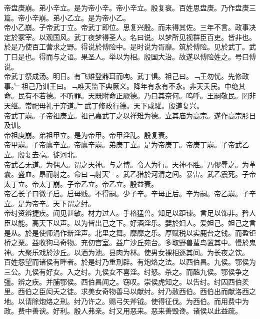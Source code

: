 \documentclass{zhvt-classic}
\begin{document}
\hspace*{2em}帝盘庚崩。弟小辛立。是为帝小辛。帝小辛立。殷复衰。百姓思盘庚。乃作盘庚三篇。帝小辛崩。弟小乙立。是为帝小乙。\\
\hspace*{2em}帝小乙崩。子帝武丁立。帝武丁即位。思复兴殷。而未得其佐。三年不言。政事决定於冢宰。以观国风。武丁夜梦得圣人。名曰说。以梦所见视群臣百吏。皆非也。於是乃使百工营求之野。得说於傅险中。是时说为胥靡。筑於傅险。见於武丁。武丁曰是也。得而与之语。果圣人。举以为相。殷国大治。故遂以傅险姓之。号曰傅说。\\
\hspace*{2em}帝武丁祭成汤。明日。有飞雉登鼎耳而呴。武丁惧。祖己曰。﹁王勿忧。先修政事。﹂祖己乃训王曰。﹁唯天监下典厥义。降年有永有不永。非天夭民。中绝其命。民有不若德。不听罪。天既附命正厥德。乃曰其奈何。呜呼。王嗣敬民。罔非天继。常祀毋礼于弃道。﹂武丁修政行德。天下咸驩。殷道复兴。\\
\hspace*{2em}帝武丁崩。子帝祖庚立。祖己嘉武丁之以祥雉为德。立其庙为高宗。遂作高宗肜日及训。\\
\hspace*{2em}帝祖庚崩。弟祖甲立。是为帝甲。帝甲淫乱。殷复衰。\\
\hspace*{2em}帝甲崩。子帝廪辛立。帝廪辛崩。弟庚丁立。是为帝庚丁。帝庚丁崩。子帝武乙立。殷复去亳。徙河北。\\
\hspace*{2em}帝武乙无道。为偶人。谓之天神。与之博。令人为行。天神不胜。乃僇辱之。为革囊。盛血。昂而射之。命曰﹁射天﹂。武乙猎於河渭之间。暴雷。武乙震死。子帝太丁立。帝太丁崩。子帝乙立。帝乙立。殷益衰。\\
\hspace*{2em}帝乙长子曰微子启。启母贱。不得嗣。少子辛。辛母正后。辛为嗣。帝乙崩。子辛立。是为帝辛。天下谓之纣。\\
\hspace*{2em}帝纣资辨捷疾。闻见甚敏。材力过人。手格猛兽。知足以距谏。言足以饰非。矜人臣以能。高天下以声。以为皆出己之下。好酒淫乐。嬖於妇人。爱妲己。妲己之言是从。於是使师涓作新淫声。北里之舞。靡靡之乐。厚赋税以实鹿台之钱。而盈钜桥之粟。益收狗马奇物。充仞宫室。益广沙丘苑台。多取野兽蜚鸟置其中。慢於鬼神。大聚乐戏於沙丘。以酒为池。县肉为林。使男女裸相逐其间。为长夜之饮。\\
\hspace*{2em}百姓怨望而诸侯有畔者。於是纣乃重刑辟。有炮烙之法。以西伯昌。九侯。鄂侯为三公。九侯有好女。入之纣。九侯女不喜淫。纣怒。杀之。而醢九侯。鄂侯争之彊。辨之疾。并脯鄂侯。西伯昌闻之。窃叹。崇侯虎知之。以告纣。纣囚西伯羑里。西伯之臣闳夭之徒。求美女奇物善马以献纣。纣乃赦西伯。西伯出而献洛西之地。以请除炮烙之刑。纣乃许之。赐弓矢斧钺。使得征伐。为西伯。而用费中为政。费中善谀。好利。殷人弗亲。纣又用恶来。恶来善毁谗。诸侯以此益疏。\\
\end{document}
